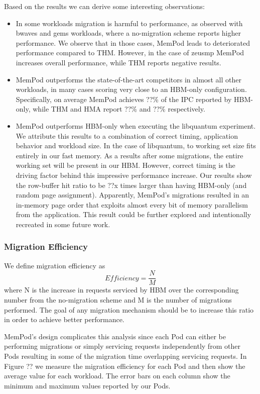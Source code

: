 Based on the results we can derive some interesting observations:
\begin{itemize}
	\item In some workloads migration is harmful to performance, as observed with bwaves and gems workloads, where a no-migration scheme reports higher performance. We observe that in those cases, MemPod leads to deteriorated performance compared to THM. However, in the case of zeusmp MemPod increases overall performance, while THM reports negative results.
	\item MemPod outperforms the state-of-the-art competitors in almost all other workloads, in many cases scoring very close to an HBM-only configuration. Specifically, on average MemPod achieves ??\% of the IPC reported by HBM-only, while THM and HMA report ??\% and ??\% respectively.
	\item MemPod outperforms HBM-only when executing the libquantum experiment. We attribute this results to a combination of correct timing, application behavior and workload size. In the case of libquantum, to working set size fits entirely in our fast memory. As a results after some migrations, the entire working set will be present in our HBM. However, correct timing is the driving factor behind this impressive performance increase. Our results show the row-buffer hit ratio to be ??x times larger than having HBM-only (and random page assignment). Apparently, MemPod's migrations resulted in an in-memory page order that exploits almost every bit of memory parallelism from the application. This result could be further explored and intentionally recreated in some future work.
\end{itemize}

\subsubsection{Migration Efficiency}

We define migration efficiency as $$ Efficiency = \frac{N}{M} $$ where N is the increase in requests serviced by HBM over the corresponding number from the no-migration scheme and M is the number of migrations performed. The goal of any migration mechanism should be to increase this ratio in order to achieve better performance.

MemPod's design complicates this analysis since each Pod can either be performing migrations or simply servicing requests independently from other Pods resulting in some of the migration time overlapping servicing requests. In Figure ?? we measure the migration efficiency for each Pod and then show the average value for each workload. The error bars on each column show the minimum and maximum values reported by our Pods.

